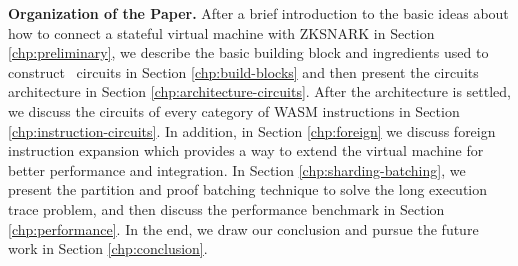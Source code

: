 \smallskip\noindent\textbf{Organization of the Paper.}
After a brief introduction to the basic ideas about how to connect a stateful virtual machine with ZKSNARK in Section \ref{chp:preliminary}, we describe the basic building block and ingredients used to construct \zkwasm\, circuits in Section \ref{chp:build-blocks} and then present the circuits architecture in Section \ref{chp:architecture-circuits}. After the architecture is settled, we discuss the circuits of every category of WASM instructions in Section \ref{chp:instruction-circuits}. In addition, in Section \ref{chp:foreign} we discuss foreign instruction expansion which provides a way to extend the virtual machine for better performance and integration. In Section \ref{chp:sharding-batching}, we present the partition and proof batching technique to solve the long execution trace problem, and then discuss the performance benchmark in Section \ref{chp:performance}. In the end, we draw our conclusion and pursue the future work in Section \ref{chp:conclusion}.  

